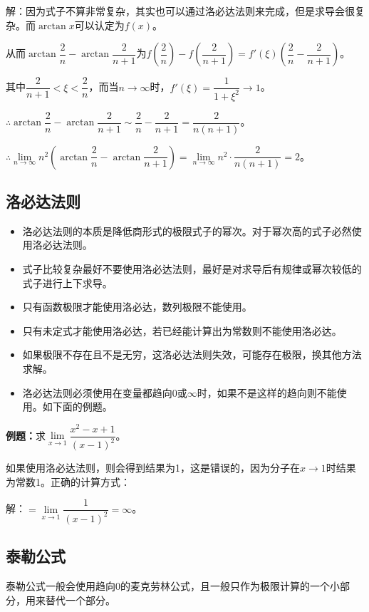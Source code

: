 解：因为式子不算非常复杂，其实也可以通过洛必达法则来完成，但是求导会很复杂。而$\arctan x$可以认定为$f(x)$。

从而$\arctan\dfrac{2}{n}-\arctan\dfrac{2}{n+1}$为$f(\dfrac{2}{n})-f(\dfrac{2}{n+1})=f'(\xi)\left(\dfrac{2}{n}-\dfrac{2}{n+1}\right)$。

其中$\dfrac{2}{n+1}<\xi<\dfrac{2}{n}$，而当$n\to\infty$时，$f'(\xi)=\dfrac{1}{1+\xi^2}\to 1$。

$\therefore\arctan\dfrac{2}{n}-\arctan\dfrac{2}{n+1}\sim\dfrac{2}{n}-\dfrac{2}{n+1}=\dfrac{2}{n(n+1)}$。

$\therefore\lim\limits_{n\to\infty}n^2\left(\arctan\dfrac{2}{n}-\arctan\dfrac{2}{n+1}\right)=\lim\limits_{n\to\infty}n^2\cdot\dfrac{2}{n(n+1)}=2$。

\subsection{洛必达法则}

\begin{itemize}
    \item 洛必达法则的本质是降低商形式的极限式子的幂次。对于幂次高的式子必然使用洛必达法则。
    \item 式子比较复杂最好不要使用洛必达法则，最好是对求导后有规律或幂次较低的式子进行上下求导。
    \item 只有函数极限才能使用洛必达，数列极限不能使用。
    \item 只有未定式才能使用洛必达，若已经能计算出为常数则不能使用洛必达。
    \item 如果极限不存在且不是无穷，这洛必达法则失效，可能存在极限，换其他方法求解。
    \item 洛必达法则必须使用在变量都趋向0或$\infty$时，如果不是这样的趋向则不能使用。如下面的例题。
\end{itemize}

\textbf{例题：}求$\lim\limits_{x\to 1}\dfrac{x^2-x+1}{(x-1)^2}$。

如果使用洛必达法则，则会得到结果为1，这是错误的，因为分子在$x\to 1$时结果为常数1。正确的计算方式：

解：$=\lim\limits_{x\to 1}\dfrac{1}{(x-1)^2}=\infty$。

\subsection{泰勒公式}

泰勒公式一般会使用趋向0的麦克劳林公式，且一般只作为极限计算的一个小部分，用来替代一个部分。

